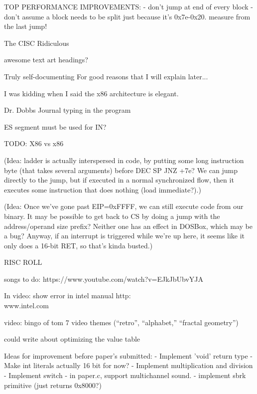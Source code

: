 \documentclass[twocolumn]{article}
\begin{document}
 TOP PERFORMANCE IMPROVEMENTS:
  - don't jump at end of every block
  - don't assume a block needs to be split just because it's 0x7e-0x20.
    measure from the last jump!

The CISC Ridiculous

awesome text art headings?

Truly self-documenting
For good reasons that I will explain later...

I was kidding when I said the x86 architecture is elegant.

Dr. Dobbs Journal typing in the program

ES segment must be used for IN?

TODO: X86 vs x86

(Idea: ladder is actually interspersed in code, by putting some long instruction
byte (that takes several arguments) before DEC SP JNZ +7e? We can jump directly
to the jump, but if executed in a normal synchronized flow, then it executes some
instruction that does nothing (load immediate?).)

(Idea: Once we've gone past EIP=0xFFFF, we can still execute code from our binary.
It may be possible to get back to CS by doing a jump with the address/operand size prefix?
Neither one has an effect in DOSBox, which may be a bug? Anyway, if an interrupt
is triggered while we're up here, it seems like it only does a 16-bit RET, so that's
kinda busted.)

RISC ROLL

songs to do: https://www.youtube.com/watch?v=EJkJbUbvYJA

In video: show error in intel manual http:\\www.intel.com

video: bingo of tom 7 video themes (``retro'', ``alphabet,''
``fractal geometry'')

could write about optimizing the value table

Ideas for improvement before paper's submitted:
 - Implement 'void' return type
 - Make int literals actually 16 bit for now?
 - Implement multiplication and division
 - Implement switch
 - in paper.c, support multichannel sound.
 - implement sbrk primitive (just returns 0x8000?)
 


\end{document}
